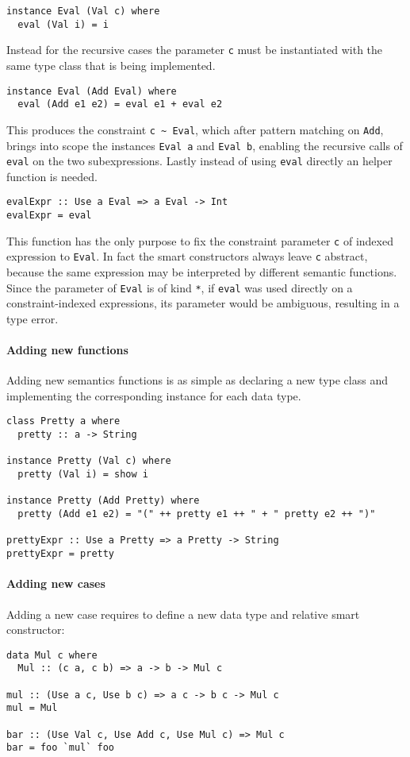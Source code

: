 \documentclass[../Thesis.tex]{subfiles}
\begin{document}
\begin{verbatim}
instance Eval (Val c) where
  eval (Val i) = i
\end{verbatim}

Instead for the recursive cases the parameter \texttt{c} must be instantiated with the same type class that is being implemented. 

\begin{verbatim}  
instance Eval (Add Eval) where
  eval (Add e1 e2) = eval e1 + eval e2
  \end{verbatim}

This produces the constraint \texttt{c \textasciitilde\ Eval}, 
which after pattern matching on \texttt{Add}, brings into scope 
the instances \texttt{Eval a} and \texttt{Eval b}, enabling the 
recursive calls of \texttt{eval} on the two subexpressions.
Lastly instead of using \texttt{eval} directly an helper function is needed.

\begin{verbatim}
evalExpr :: Use a Eval => a Eval -> Int
evalExpr = eval
\end{verbatim}

This function has the only purpose to fix the constraint parameter \texttt{c} 
of indexed expression to \texttt{Eval}.
In fact the smart constructors always leave \texttt{c} abstract, because the same expression may be interpreted by different semantic functions.
Since the parameter of \texttt{Eval} is of kind \texttt{*}, if \texttt{eval}
was used directly on a constraint-indexed expressions, its parameter
would be ambiguous, resulting in a type error.

\paragraph{Adding new functions}
Adding new semantics functions is as simple as declaring a new type class and 
implementing the corresponding instance for each data type.
\begin{verbatim}
class Pretty a where
  pretty :: a -> String

instance Pretty (Val c) where
  pretty (Val i) = show i  

instance Pretty (Add Pretty) where
  pretty (Add e1 e2) = "(" ++ pretty e1 ++ " + " pretty e2 ++ ")"

prettyExpr :: Use a Pretty => a Pretty -> String
prettyExpr = pretty
\end{verbatim}

\paragraph{Adding new cases}
Adding a new case requires to define a new data type and relative
smart constructor:
\begin{verbatim}
data Mul c where
  Mul :: (c a, c b) => a -> b -> Mul c

mul :: (Use a c, Use b c) => a c -> b c -> Mul c
mul = Mul

bar :: (Use Val c, Use Add c, Use Mul c) => Mul c
bar = foo `mul` foo
\end{verbatim}
\end{document}
